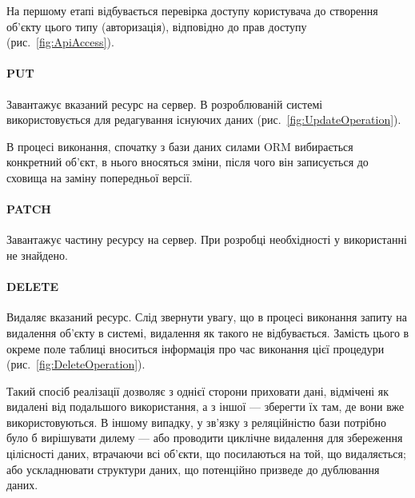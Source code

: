 На першому етапі відбувається перевірка доступу користувача до створення об’єкту цього типу (авторизація), відповідно до прав доступу (рис.~\ref{fig:ApiAccess}).

\paragraph{PUT}

Завантажує вказаний ресурс на сервер. В розроблюваній системі використовується для редагування існуючих даних (рис.~\ref{fig:UpdateOperation}). 

В процесі виконання, спочатку з бази даних силами ORM вибирається конкретний об’єкт, в нього вносяться зміни, після чого він записується до сховища на заміну попередньої версії.

\paragraph{PATCH}

Завантажує частину ресурсу на сервер. При розробці необхідності у використанні не знайдено.

\paragraph{DELETE}

Видаляє вказаний ресурс.
Слід звернути увагу, що в процесі виконання запиту на видалення об’єкту в системі, видалення як такого не відбувається. Замість цього в окреме поле таблиці вноситься інформація про час виконання цієї процедури (рис.~\ref{fig:DeleteOperation}).

Такий спосіб реалізації дозволяє з однієї сторони приховати дані, відмічені як видалені від подальшого використання, а з іншої — зберегти їх там, де вони вже використовуються. В іншому випадку, у зв’язку з реляційністю бази потрібно було б вирішувати дилему — або проводити циклічне видалення для збереження цілісності даних, втрачаючи всі об’єкти, що посилаються на той, що видаляється; або ускладнювати структури даних, що потенційно призведе до дублювання даних.
